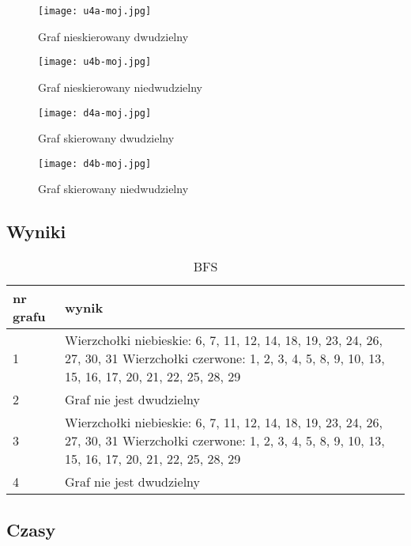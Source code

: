 \documentclass[12pt, letterpaper]{article}
\begin{document}
\begin{figure}[H]
    \centering
    \texttt{[image: u4a-moj.jpg]}
    \caption{Graf nieskierowany dwudzielny}
\end{figure}

\begin{figure}[H]
    \centering
    \texttt{[image: u4b-moj.jpg]}
    \caption{Graf nieskierowany niedwudzielny}
\end{figure}

\begin{figure}[H]
    \centering
    \texttt{[image: d4a-moj.jpg]}
    \caption{Graf skierowany dwudzielny}
\end{figure}

\begin{figure}[H]
    \centering
    \texttt{[image: d4b-moj.jpg]}
    \caption{Graf skierowany niedwudzielny}
\end{figure}

\subsection{Wyniki}

\begin{table}[H]\centering
    \caption{BFS}
    \begin{tabular}{|p{1cm}|p{10cm}|}\hline
        nr grafu & wynik
        \\\hline
        1        & Wierzchołki niebieskie:
        6, 7, 11, 12, 14, 18, 19, 23, 24, 26, 27, 30, 31
        Wierzchołki czerwone:
        1, 2, 3, 4, 5, 8, 9, 10, 13, 15, 16, 17, 20, 21, 22, 25, 28, 29
        \\\hline
        2        & Graf nie jest dwudzielny
        \\\hline
        3        & Wierzchołki niebieskie:
        6, 7, 11, 12, 14, 18, 19, 23, 24, 26, 27, 30, 31
        Wierzchołki czerwone:
        1, 2, 3, 4, 5, 8, 9, 10, 13, 15, 16, 17, 20, 21, 22, 25, 28, 29
        \\\hline
        4        & Graf nie jest dwudzielny
        \\\hline
    \end{tabular}
\end{table}

\subsection{Czasy}
\end{document}
